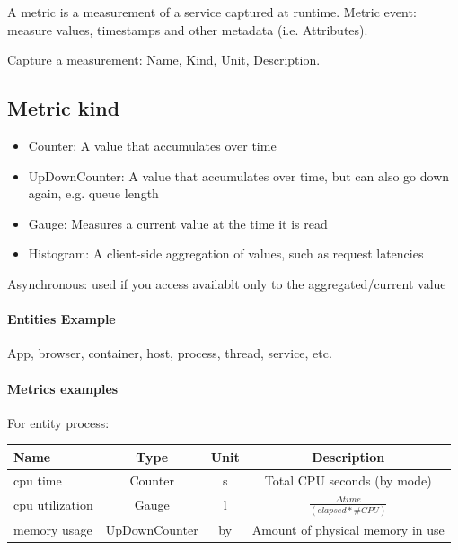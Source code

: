 A metric is a measurement of a service captured at runtime.
Metric event: measure values, timestamps and other metadata (i.e. Attributes).

Capture a measurement: Name, Kind, Unit, Description.

\subsection{Metric kind}

\begin{itemize}
  \item Counter: A value that accumulates over time
  \item UpDownCounter: A value that accumulates over time, but can also go down again, e.g. queue length
  \item Gauge: Measures a current value at the time it is read
  \item Histogram: A client-side aggregation of values, such as request latencies
\end{itemize}

Asynchronous: used if you access availablt only to the aggregated/current value

\paragraph{Entities Example}

App, browser, container, host, process, thread, service, etc.

\paragraph{Metrics examples}

For entity process:

\begin{table}[h!]
  \renewcommand{\arraystretch}{1.4}
  \centering
  \begin{tabular}{l c c c}
    \toprule
    \textbf{Name}   & \textbf{Type} & \textbf{Unit} & \textbf{Description}                    \\
    \midrule
    cpu time        & Counter       & s             & Total CPU seconds (by mode)             \\
    cpu utilization & Gauge         & l             & $\frac{\Delta time}{(elapsed * \#CPU)}$ \\
    memory usage    & UpDownCounter & by            & Amount of physical memory in use        \\
    \bottomrule
  \end{tabular}
\end{table}


